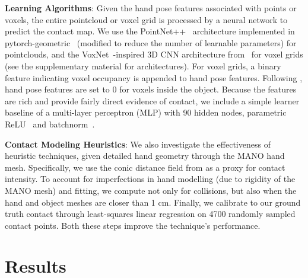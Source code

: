 \documentclass[runningheads]{llncs}
\begin{document}
\noindent\textbf{Learning Algorithms}: Given the hand pose features associated with points or voxels, the entire pointcloud or voxel grid is processed by a neural network to predict the contact map. We use the PointNet++~\cite{qi2017pointnet++} architecture implemented in pytorch-geometric~\cite{paszke2017automatic,pytorch_geometric} (modified to reduce the number of learnable parameters) for pointclouds, and the VoxNet~\cite{maturana2015voxnet}-inspired 3D CNN architecture from~\cite{contactdbv1} for voxel grids (see the supplementary material for architectures). For voxel grids, a binary feature indicating voxel occupancy is appended to hand pose features. Following \cite{contactdbv1}, hand pose features are set to 0 for voxels inside the object. Because the features are rich and provide fairly direct evidence of contact, we include a simple learner baseline of a multi-layer perceptron (MLP) with 90 hidden nodes, parametric ReLU~\cite{he2015delving} and batchnorm~\cite{ioffe2015batch}.

\noindent\textbf{Contact Modeling Heuristics}: We also investigate the effectiveness of heuristic techniques, given detailed hand geometry through the MANO hand mesh. Specifically, we use the conic distance field  from \cite{ballan2012motion,handsInActionDataset} as a proxy for contact intensity. To account for imperfections in hand modelling (due to rigidity of the MANO mesh) and fitting, we compute  not only for collisions, but also when the hand and object meshes are closer than 1 cm. Finally, we calibrate  to our ground truth contact through least-squares linear regression on 4700 randomly sampled contact points. Both these steps improve the technique's performance.  



%
 \section{Results} \label{sec:results}
\end{document}
